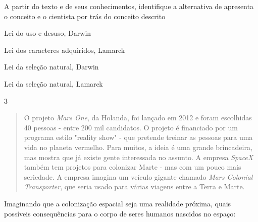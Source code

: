 {{A partir do texto e de seus conhecimentos, identifique a alternativa de
apresenta o conceito e o cientista por trás do conceito descrito

\begin{escolha}
\item
  Lei do uso e desuso, Darwin
\item
  Lei dos caracteres adquiridos, Lamarck
\item
  Lei da seleção natural, Darwin
\item
  Lei da seleção natural, Lamarck
\end{escolha}


\num{3}
  \begin{quote}
  O projeto \emph{Mars One}, da Holanda, foi lançado em 2012 e foram
  escolhidas 40 pessoas - entre 200 mil candidatos. O projeto é
  financiado por um programa estilo "reality show" - que pretende
  treinar as pessoas para uma vida no planeta vermelho. Para muitos, a
  ideia é uma grande brincadeira, mas mostra que já existe gente
  interessada no assunto. A empresa \emph{SpaceX} também tem projetos
  para colonizar Marte - mas com um pouco mais seriedade. A empresa
  imagina um veículo gigante chamado \emph{Mars Colonial Transporter},
  que seria usado para várias viagens entre a Terra e Marte.

\end{quote}

Imaginando que a colonização espacial seja uma realidade próxima, quais
possíveis consequências para o corpo de seres humanos nascidos no
espaço:

}}

